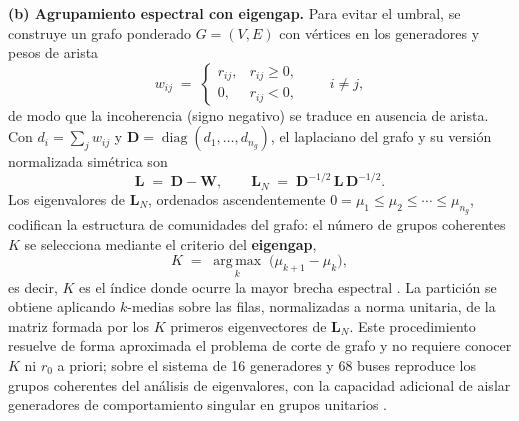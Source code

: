 \textbf{(b) Agrupamiento espectral con eigengap.} Para evitar el umbral,
se construye un grafo ponderado $G=(V,E)$ con vértices en los generadores
y pesos de arista \cite{jiang2021}
\begin{equation}
    w_{ij} \;=\;
    \begin{cases}
        r_{ij}, & r_{ij} \ge 0,\\
        0, & r_{ij} < 0,
    \end{cases}
    \qquad i \ne j,
    \label{eq:edge_weights}
\end{equation}
de modo que la incoherencia (signo negativo) se traduce en ausencia de
arista. Con $d_i = \sum_{j} w_{ij}$ y
$\mathbf{D} = \operatorname{diag}(d_1,\ldots,d_{n_g})$, el laplaciano del
grafo y su versión normalizada simétrica son
\begin{equation}
    \mathbf{L} \;=\; \mathbf{D} - \mathbf{W},
    \qquad
    \mathbf{L}_N \;=\; \mathbf{D}^{-1/2}\,\mathbf{L}\,\mathbf{D}^{-1/2}.
    \label{eq:laplacian}
\end{equation}
Los eigenvalores de $\mathbf{L}_N$, ordenados ascendentemente
$0 = \mu_1 \le \mu_2 \le \cdots \le \mu_{n_g}$, codifican la estructura de
comunidades del grafo: el número de grupos coherentes $K$ se selecciona
mediante el criterio del \textbf{eigengap},
\begin{equation}
    K \;=\; \operatorname*{arg\,max}_{k}\;
    \bigl( \mu_{k+1} - \mu_k \bigr),
    \label{eq:eigengap}
\end{equation}
es decir, $K$ es el índice donde ocurre la mayor brecha espectral
\cite{jiang2021}. La partición se obtiene aplicando $k$-medias sobre las
filas, normalizadas a norma unitaria, de la matriz formada por los $K$
primeros eigenvectores de $\mathbf{L}_N$. Este procedimiento resuelve de
forma aproximada el problema de corte de grafo y no requiere conocer
$K$ ni $r_0$ a priori; sobre el sistema de 16 generadores y 68 buses
reproduce los grupos coherentes del análisis de eigenvalores, con la
capacidad adicional de aislar generadores de comportamiento singular en
grupos unitarios \cite{jiang2021}.

\chapterbibliography